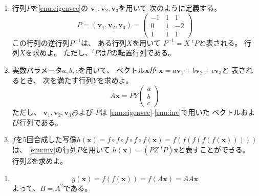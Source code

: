 \documentclass[12pt,b5paper]{ltjsarticle}
\begin{document}
\begin{description}
\begin{enumerate}
        \item \label{enu:inv}
             行列$P$を\ref{enu:eigenvec}の
             $\bm{v}_{1},\bm{v}_{2},\bm{v}_{3}$を用いて
             次のように定義する。
             \begin{equation}
              P = (\bm{v}_{1},\bm{v}_{2},\bm{v}_{3})
               =
               \begin{pmatrix}
                -1 & 1 & 1 \\
                0 & 1 & -2 \\
                1 & 1 & 1
               \end{pmatrix}
             \end{equation}
             この行列の逆行列$P^{-1}$は、
             ある行列$X$を用いて
             $P^{-1}=X \;{}^{t}\!P$と表される。
             行列$X$を求めよ。
             ただし、${}^{t}\!P$は$P$の転置行列である。



        \item
             実数パラメータ$a,b,c$を用いて、
             ベクトル$\bm{x}$が
             $\bm{x}=a\bm{v}_{1}+b\bm{v}_{2}+c\bm{v}_{3}$と
             表されるとき、
             次を満たす行列$Y$を求めよ。
             \begin{equation}
              A\bm{x} = PY\begin{pmatrix} a \\ b \\ c \end{pmatrix}
             \end{equation}
             ただし、
             $\bm{v}_{1},\bm{v}_{2},\bm{v}_{3}$および
             $P$は
             \ref{enu:eigenvec}-\ref{enu:inv}で用いた
             ベクトルおよび行列である。


        \item
             $f$を5回合成した写像$h(\bm{x})=f\circ f\circ f\circ f\circ f(\bm{x})=f(f(f(f(f(\bm{x})))))$は、
             \ref{enu:inv}の行列$P$を用いて
             $h(\bm{x})=(PZ\;{}^{t}\!P)\bm{x}$と表すことができる。
             行列$Z$を求めよ。


       \end{enumerate}

       \dotfill

       \begin{enumerate}
        \item
             \begin{equation}
              g(\bm{x})=f(f(\bm{x}))=f(A\bm{x})=AA\bm{x}
             \end{equation}
             よって、$B=A^{2}$である。



\end{enumerate}
\end{description}
\end{document}
